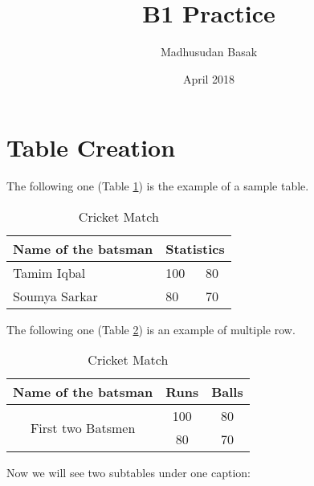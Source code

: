 \documentclass{article}
\title{B1 Practice}
\author{Madhusudan Basak}
\date{April 2018}
\begin{document}
\maketitle

\section{Table Creation}
The following one (Table \ref{tab:1}) is the example of a sample table.
\begin{table}[h!]
\centering
    \begin{tabular}{||m{2cm}| m{2cm}| m{2cm}||}
    \hline
    Name of the batsman & \multicolumn{2}{c|}{Statistics} \\
    \hline
    \hline
    Tamim Iqbal & 100 & 80 \\
    \hline
    Soumya Sarkar & 80 & 70 \\
    \hline
    \end{tabular}
    \caption{Cricket Match}
    \label{tab:1}
\end{table}


The following one (Table \ref{tab:2}) is an example of multiple row.

\begin{table}[h!]
\centering
    \begin{tabular}{|c|c|c|}
    \hline
    Name of the batsman & Runs & Balls \\
    \hline
    \multirow{2}{*}{First two Batsmen} & 100 & 80 \\
    
    & 80 & 70 \\
    \hline
    \end{tabular}
    \caption{Cricket Match}
    \label{tab:2}
\end{table}

Now we will see two subtables under one caption:
\end{document}
